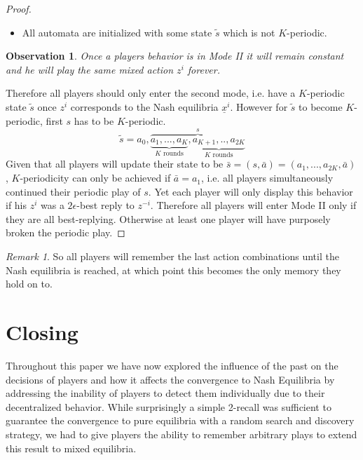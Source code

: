 \documentclass[a4paper]{article}
\theoremstyle{plain}
\newtheorem{observation}{Observation}
\theoremstyle{remark}
\newtheorem{remark}{Remark}
\begin{document}
\begin{proof}
\begin{itemize}
		\item All automata are initialized with some state $\tilde{s}$ which is not $K$-periodic.
	\end{itemize}
	
	\begin{observation}
		Once a players behavior is in Mode II it will remain constant and he will play the same mixed action
		$z^i$ forever.
	\end{observation}
	Therefore all players should only enter the second mode, i.e. have a $K$-periodic state $\tilde{s}$ once $z^i$
	corresponds to the Nash equilibria $\underline{x}^i$. However for $\tilde{s}$ to become $K$-periodic, first $s$ has to
	be $K$-periodic.
	\[
		\tilde{s} = a_{0},  \overbrace{\underbrace{a_{1},  ..., a_{K}}_{K \text{ rounds}}, \underbrace{a_{K+1}, .., a_{2K}}_{K \text{ rounds}} }^{s}
	\]
	Given that all players will update their state to be $\bar{s} = (s, \bar{a}) = (a_1, ..., a_{2K}, \bar{a})$,
	$K$-periodicity can only be achieved if $\bar{a} = a_1$, i.e. all players simultaneously continued their periodic play of $s$.
	Yet each player will only display this behavior if his $z^i$ was a $2\epsilon$-best reply to $z^{-i}$.
	Therefore all players will enter Mode II only if they are all best-replying. Otherwise at least one player will have
	purposely broken the periodic play.
\end{proof}

\begin{remark}
	So all players will remember the last action combinations
	until the Nash equilibria is reached, at which point this becomes the only memory they hold on to.
\end{remark}

\section{Closing}

Throughout this paper we have now explored the influence of the past on the decisions of players
and how it affects the convergence to Nash Equilibria by addressing the inability of players to detect them individually
due to their decentralized behavior.
While surprisingly a simple 2-recall
was sufficient to guarantee the convergence to pure equilibria with a random search and discovery
strategy, we had to give players the ability to remember arbitrary plays to extend this result to mixed
equilibria. 
\end{document}
